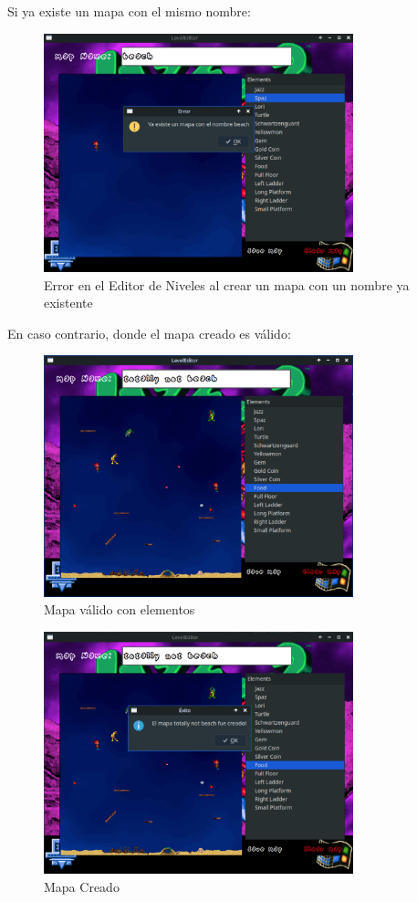 \documentclass[titlepage,a4paper]{article}
\begin{document}
Si ya existe un mapa con el mismo nombre:

\begin{figure}[H]
  \centering
  \includegraphics[width=0.8\textwidth]{images/LevelEditor/MapAlreadyExists.png}
  \caption{Error en el Editor de Niveles al crear un mapa con un nombre ya existente}
  \label{fig:map-exists}
\end{figure}

En caso contrario, donde el mapa creado es válido:

\begin{figure}[H]
  \centering
  \includegraphics[width=0.8\textwidth]{images/LevelEditor/MapWithElements.png}
  \caption{Mapa válido con elementos}
  \label{fig:valid-map}
\end{figure}

\begin{figure}[H]
  \centering
  \includegraphics[width=0.8\textwidth]{images/LevelEditor/MapCreated.png}
  \caption{Mapa Creado}
  \label{fig:map-created}
\end{figure}
\end{document}
